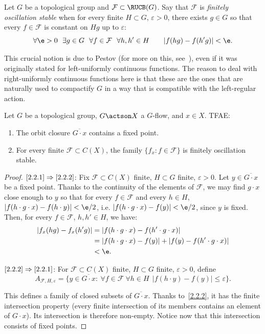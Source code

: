 \begin{defi}
Let $G$ be a topological group and $\mathcal F \subset \RUCB(G)$. Say that $\mathcal F$ is \emph{finitely oscillation stable} when for every finite $H\subset G$, $\varepsilon >0$, there exists $g\in G$ so that every $f\in \mathcal F$ is constant on $Hg$ up to $\varepsilon$:
\[
\forall \e >0 \ \ \exists g\in G \ \ \forall f\in \mathcal F \ \ \forall h,h' \in H \qquad |f(hg)-f(h'g)|<\e.
\]
\end{defi}

This crucial notion is due to Pestov (for more on this, see~\cite{Pe}), even if it was originally stated for left-uniformly continuous functions. The reason to deal with right-uniformly continuous functions here is that these are the ones that are naturally used to compactify $G$ in a way that is compatible with the left-regular action.

\begin{prop}
Let $G$ be a topological group, $G\actson X$ a $G$-flow, and $x\in X$. TFAE:
\begin{enumerate}
\item \label{2.2.1} The orbit closure $\overline{G\cdot x}$ contains a fixed point.
\item \label{2.2.2} For every finite $\mathcal F\subset C(X)$, the family $\{ f_{x}:f\in \mathcal F\}$ is finitely oscillation stable.
\end{enumerate}
\end{prop}

\begin{proof}
$\eqref{2.2.1}\Rightarrow \eqref{2.2.2}$: Fix $\mathcal F\subset C(X)$ finite, $H\subset G$ finite, $\varepsilon>0$. Let $y\in \overline{G\cdot x}$ be a fixed point. Thanks to the continuity of the elements of $\mathcal F$, we may find $g\cdot x$ close enough to $y$ so that for every $f\in \mathcal F$ and every $h\in H$, $|f(h\cdot g\cdot x) - f(h\cdot y)|<\e/2$, i.e. $|f(h\cdot g\cdot x) - f(y)|<\e/2$, since $y$ is fixed. Then, for every $f\in \mathcal F$, $h, h'\in H$, we have:
\begin{align*}
\ensuremath
\left|f_{x}(hg) - f_{x}(h'g)\right| & = |f(h\cdot g\cdot x) - f(h'\cdot g\cdot x)| \\
& = |f(h\cdot g\cdot x) - f(y)| + |f(y) - f(h'\cdot g\cdot x)| \\
& < \e.
\end{align*}

$\eqref{2.2.2}\Rightarrow \eqref{2.2.1}$: For $\mathcal F\subset C(X)$ finite, $H\subset G$ finite, $\varepsilon>0$, define
\[
A_{\mathcal F, H, \varepsilon} = \{ y\in \overline{G\cdot x} :\: \forall f \in \mathcal F \ \forall h\in H \ \ |f(h\cdot y) - f(y)|\leq \varepsilon\}.
\]

This defines a family of closed subsets of $\overline{G\cdot x}$. Thanks to~\eqref{2.2.2}, it has the finite intersection property (every finite intersection of its members contains an element of $G\cdot x$). Its intersection is therefore non-empty. Notice now that this intersection consists of fixed points.
\end{proof}

